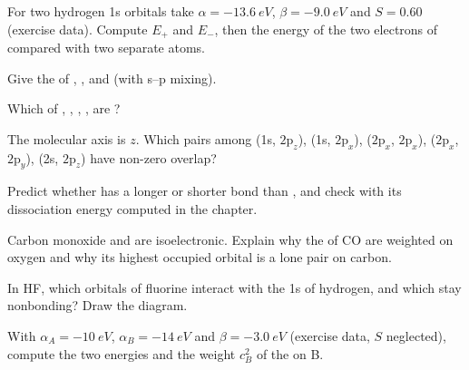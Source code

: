 \begin{exercise}[$\star$]\label{exo:b2:diatomic-mos:1}
For two hydrogen 1s orbitals take $\alpha = \qty{-13.6}{eV}$, $\beta = \qty{-9.0}{eV}$ and
$S = 0.60$ (exercise data). Compute $E_+$ and $E_-$, then the energy of the two
electrons of  compared with two separate atoms.
\end{exercise}

\begin{exercise}[$\star$]\label{exo:b2:diatomic-mos:2}
Give the  of , ,  and  (with s--p
mixing).
\end{exercise}

\begin{exercise}[$\star$]\label{exo:b2:diatomic-mos:3}
Which of , , , ,  are ?
\end{exercise}

\begin{exercise}[$\star$]\label{exo:b2:diatomic-mos:4}
The molecular axis is $z$. Which pairs among (1s, $2\mathrm p_z$), (1s,
$2\mathrm p_x$), ($2\mathrm p_x$, $2\mathrm p_x$), ($2\mathrm p_x$, $2\mathrm p_y$),
(2s, $2\mathrm p_z$) have non-zero overlap?
\end{exercise}

\begin{exercise}[$\star\star$]\label{exo:b2:diatomic-mos:5}
Predict whether  has a longer or shorter bond than , and check with
its dissociation energy computed in the chapter.
\end{exercise}

\begin{exercise}[$\star\star$]\label{exo:b2:diatomic-mos:6}
Carbon monoxide and  are isoelectronic. Explain why the  of
CO are weighted on oxygen and why its highest occupied orbital is a lone pair on
carbon.
\end{exercise}

\begin{exercise}[$\star\star$]\label{exo:b2:diatomic-mos:7}
In HF, which orbitals of fluorine interact with the 1s of hydrogen, and which stay
nonbonding? Draw the diagram.
\end{exercise}

\begin{exercise}[$\star\star$]\label{exo:b2:diatomic-mos:8}
With $\alpha_A = \qty{-10}{eV}$, $\alpha_B = \qty{-14}{eV}$ and $\beta = \qty{-3.0}{eV}$
(exercise data, $S$ neglected), compute the two energies and the weight $c_B^2$ of
the  on B.
\end{exercise}

